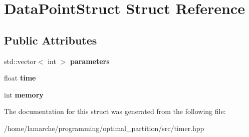 \hypertarget{structDataPointStruct}{\section{Data\-Point\-Struct Struct Reference}
\label{structDataPointStruct}
}
\subsection*{Public Attributes}
\begin{DoxyCompactItemize}
\item 
\hypertarget{structDataPointStruct_ab19cdad849d37de06c02cacc5ec50cce}{std\-::vector$<$ int $>$ {\bfseries parameters}}\label{structDataPointStruct_ab19cdad849d37de06c02cacc5ec50cce}

\item 
\hypertarget{structDataPointStruct_ae1dae54ff363ef8a6d946907b1621506}{float {\bfseries time}}\label{structDataPointStruct_ae1dae54ff363ef8a6d946907b1621506}

\item 
\hypertarget{structDataPointStruct_a6d345b8aa7e79cd06402446d73d19520}{int {\bfseries memory}}\label{structDataPointStruct_a6d345b8aa7e79cd06402446d73d19520}

\end{DoxyCompactItemize}


The documentation for this struct was generated from the following file\-:\begin{DoxyCompactItemize}
\item 
/home/lamarche/programming/optimal\-\_\-partition/src/timer.\-hpp\end{DoxyCompactItemize}
